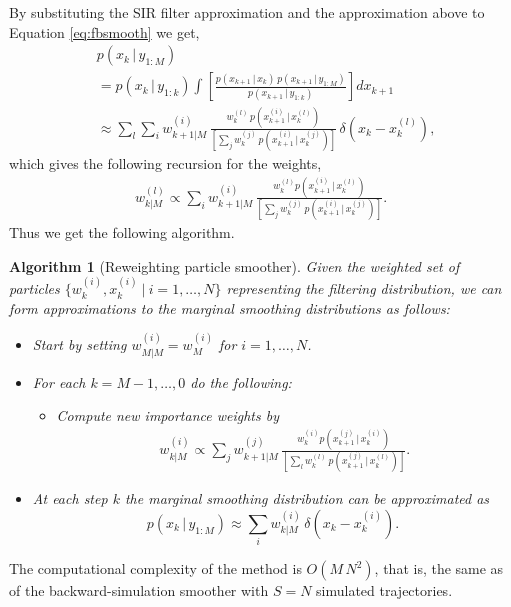 \documentclass[twocolumn]{autart}    %
\newtheorem{algo}{Algorithm}[section]
\begin{document}
%
By substituting the SIR filter approximation and the approximation above to Equation \eqref{eq:fbsmooth} we get,
%
\begin{equation}
\begin{split}
  &p(x_k\,|\,y_{1:M}) \\
  &= p(x_k\,|\,y_{1:k})
     \int \left[ \frac{p(x_{k+1}\,|\,x_k)
                 \, p(x_{k+1}\,|\,y_{1:M})}
                 {p(x_{k+1}\,|\,y_{1:k})} \right]
         dx_{k+1} \\
  &\approx
  \sum_l
  \sum_i w^{(i)}_{k+1|M} \,
  \frac{w_k^{(l)} \,  p(x_{k+1}^{(i)}\,|\,x_{k}^{(l)})}
   {\left[ \sum_j w_k^{(j)} \, p(x_{k+1}^{(i)}\,|\,x_{k}^{(j)}) \right]} \, \delta(x_k - x_{k}^{(l)}),
\end{split}
\label{eq:rw}
\end{equation}
%
which gives the following recursion for the weights,
%
\begin{equation}
\begin{split}
  w^{(l)}_{k|M} \propto
   \sum_i w^{(i)}_{k+1|M} \,
  \frac{w_k^{(l)} p(x_{k+1}^{(i)}\,|\,x_{k}^{(l)})}
   {\left[ \sum_j w_k^{(j)} \, p(x_{k+1}^{(i)}\,|\,x_{k}^{(j)}) \right]}.
\end{split}
\end{equation}
%
Thus we get the following algorithm.
%
\begin{algo}[Reweighting particle smoother]
  \label{alg:rwsmooth} 
  Given the weighted set of particles $\{ w_k^{(i)}, x_k^{(i)} ~|~
  i=1,\ldots,N \}$ representing the filtering distribution, we can
  form approximations to the marginal smoothing distributions as
  follows:
\begin{itemize}
\item Start by setting $w_{M|M}^{(i)} = w_M^{(i)}$ for $i=1,\ldots,N$.
\item For each $k=M-1,\ldots,0$ do the following:
  \begin{itemize}
  \item Compute new importance weights by
    \begin{equation}
      \begin{split}
        w^{(i)}_{k|M} \propto
        \sum_j w^{(j)}_{k+1|M} \,
        \frac{w_k^{(i)} p(x_{k+1}^{(j)}\,|\,x_{k}^{(i)})}
        {\left[ \sum_l w_k^{(l)} \, p(x_{k+1}^{(j)}\,|\,x_{k}^{(l)}) \right]}.
      \end{split}
    \end{equation}
  \end{itemize}
\item At each step $k$ the marginal smoothing distribution can be
  approximated as
 \begin{equation}
     p(x_k\,|\,y_{1:M})
     \approx \sum_i w_{k|M}^{(i)} \, \delta(x_k - x_k^{(i)}).
  \end{equation}
\end{itemize}
\end{algo}
%
The computational complexity of the method is $O(M\,N^2)$, that is, the same as of the backward-simulation smoother with $S = N$ simulated trajectories.
\end{document}
